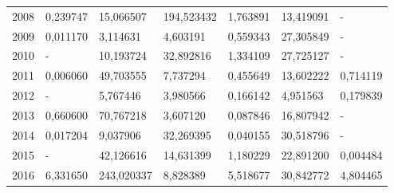 \begin{table}
\begin{tabular}{p{1cm}p{2cm}p{2cm}p{2cm}p{2cm}p{2cm}p{2cm}}
 2008 &                                 0,239747 &            15,066507 &                           194,523432 &                         1,763891 &                      13,419091 &                                          - \\
 2009 &                                 0,011170 &             3,114631 &                             4,603191 &                         0,559343 &                      27,305849 &                                          - \\
 2010 &                                        - &            10,193724 &                            32,892816 &                         1,334109 &                      27,725127 &                                          - \\
 2011 &                                 0,006060 &            49,703555 &                             7,737294 &                         0,455649 &                      13,602222 &                                   0,714119 \\
 2012 &                                        - &             5,767446 &                             3,980566 &                         0,166142 &                       4,951563 &                                   0,179839 \\
 2013 &                                 0,660600 &            70,767218 &                             3,607120 &                         0,087846 &                      16,807942 &                                          - \\
 2014 &                                 0,017204 &             9,037906 &                            32,269395 &                         0,040155 &                      30,518796 &                                          - \\
 2015 &                                        - &            42,126616 &                            14,631399 &                         1,180229 &                      22,891200 &                                   0,004484 \\
 2016 &                                 6,331650 &           243,020337 &                             8,828389 &                         5,518677 &                      30,842772 &                                   4,804465 \\
\bottomrule
\end{tabular}
\end{table}
